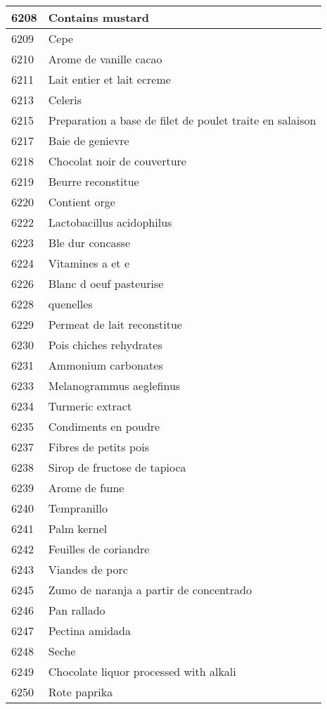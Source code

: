 \begin{longtable}{|l|l|}
6208 & Contains mustard \\ \hline 
6209 & Cepe \\ \hline 
6210 & Arome de vanille cacao \\ \hline 
6211 & Lait entier et lait ecreme \\ \hline 
6213 & Celeris \\ \hline 
6215 & Preparation a base de filet de poulet traite en salaison \\ \hline 
6217 & Baie de genievre \\ \hline 
6218 & Chocolat noir de couverture \\ \hline 
6219 & Beurre reconstitue \\ \hline 
6220 & Contient orge \\ \hline 
6222 & Lactobacillus acidophilus \\ \hline 
6223 & Ble dur concasse \\ \hline 
6224 & Vitamines a et e \\ \hline 
6226 & Blanc d oeuf pasteurise \\ \hline 
6228 & quenelles \\ \hline 
6229 & Permeat de lait reconstitue \\ \hline 
6230 & Pois chiches rehydrates \\ \hline 
6231 & Ammonium carbonates \\ \hline 
6233 & Melanogrammus aeglefinus \\ \hline 
6234 & Turmeric extract \\ \hline 
6235 & Condiments en poudre \\ \hline 
6237 & Fibres de petits pois \\ \hline 
6238 & Sirop de fructose de tapioca \\ \hline 
6239 & Arome de fume \\ \hline 
6240 & Tempranillo \\ \hline 
6241 & Palm kernel \\ \hline 
6242 & Feuilles de coriandre \\ \hline 
6243 & Viandes de porc \\ \hline 
6245 & Zumo de naranja a partir de concentrado \\ \hline 
6246 & Pan rallado \\ \hline 
6247 & Pectina amidada \\ \hline 
6248 & Seche \\ \hline 
6249 & Chocolate liquor processed with alkali \\ \hline 
6250 & Rote paprika \\ \hline 

\end{longtable}
